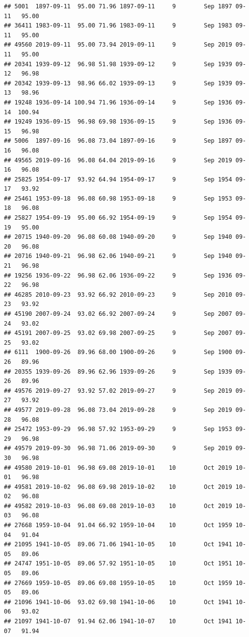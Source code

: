 \documentclass{article}\usepackage[]{graphicx}\usepackage[]{color}
\makeatletter
\newenvironment{kframe}{%
 \def\at@end@of@kframe{}%
 \ifinner\ifhmode%
  \def\at@end@of@kframe{\end{minipage}}%
  \begin{minipage}{\columnwidth}%
 \fi\fi%
 \def\FrameCommand##1{\hskip\@totalleftmargin \hskip-\fboxsep
 \colorbox{shadecolor}{##1}\hskip-\fboxsep
     \hskip-\linewidth \hskip-\@totalleftmargin \hskip\columnwidth}%
 \MakeFramed {\advance\hsize-\width
   \@totalleftmargin\z@ \linewidth\hsize
   \@setminipage}}%
 {\par\unskip\endMakeFramed%
 \at@end@of@kframe}
\newenvironment{knitrout}{}{} %
\makeatother
\begin{document}
\begin{knitrout}
\begin{kframe}
\begin{verbatim}
## 5001  1897-09-11  95.00 71.96 1897-09-11     9        Sep 1897 09-11   95.00
## 36411 1983-09-11  95.00 71.96 1983-09-11     9        Sep 1983 09-11   95.00
## 49560 2019-09-11  95.00 73.94 2019-09-11     9        Sep 2019 09-11   95.00
## 20341 1939-09-12  96.98 51.98 1939-09-12     9        Sep 1939 09-12   96.98
## 20342 1939-09-13  98.96 66.02 1939-09-13     9        Sep 1939 09-13   98.96
## 19248 1936-09-14 100.94 71.96 1936-09-14     9        Sep 1936 09-14  100.94
## 19249 1936-09-15  96.98 69.98 1936-09-15     9        Sep 1936 09-15   96.98
## 5006  1897-09-16  96.08 73.04 1897-09-16     9        Sep 1897 09-16   96.08
## 49565 2019-09-16  96.08 64.04 2019-09-16     9        Sep 2019 09-16   96.08
## 25825 1954-09-17  93.92 64.94 1954-09-17     9        Sep 1954 09-17   93.92
## 25461 1953-09-18  96.08 60.98 1953-09-18     9        Sep 1953 09-18   96.08
## 25827 1954-09-19  95.00 66.92 1954-09-19     9        Sep 1954 09-19   95.00
## 20715 1940-09-20  96.08 60.08 1940-09-20     9        Sep 1940 09-20   96.08
## 20716 1940-09-21  96.98 62.06 1940-09-21     9        Sep 1940 09-21   96.98
## 19256 1936-09-22  96.98 62.06 1936-09-22     9        Sep 1936 09-22   96.98
## 46285 2010-09-23  93.92 66.92 2010-09-23     9        Sep 2010 09-23   93.92
## 45190 2007-09-24  93.02 66.92 2007-09-24     9        Sep 2007 09-24   93.02
## 45191 2007-09-25  93.02 69.98 2007-09-25     9        Sep 2007 09-25   93.02
## 6111  1900-09-26  89.96 68.00 1900-09-26     9        Sep 1900 09-26   89.96
## 20355 1939-09-26  89.96 62.96 1939-09-26     9        Sep 1939 09-26   89.96
## 49576 2019-09-27  93.92 57.02 2019-09-27     9        Sep 2019 09-27   93.92
## 49577 2019-09-28  96.08 73.04 2019-09-28     9        Sep 2019 09-28   96.08
## 25472 1953-09-29  96.98 57.92 1953-09-29     9        Sep 1953 09-29   96.98
## 49579 2019-09-30  96.98 71.06 2019-09-30     9        Sep 2019 09-30   96.98
## 49580 2019-10-01  96.98 69.08 2019-10-01    10        Oct 2019 10-01   96.98
## 49581 2019-10-02  96.08 69.98 2019-10-02    10        Oct 2019 10-02   96.08
## 49582 2019-10-03  96.08 69.08 2019-10-03    10        Oct 2019 10-03   96.08
## 27668 1959-10-04  91.04 66.92 1959-10-04    10        Oct 1959 10-04   91.04
## 21095 1941-10-05  89.06 71.06 1941-10-05    10        Oct 1941 10-05   89.06
## 24747 1951-10-05  89.06 57.92 1951-10-05    10        Oct 1951 10-05   89.06
## 27669 1959-10-05  89.06 69.08 1959-10-05    10        Oct 1959 10-05   89.06
## 21096 1941-10-06  93.02 69.98 1941-10-06    10        Oct 1941 10-06   93.02
## 21097 1941-10-07  91.94 62.06 1941-10-07    10        Oct 1941 10-07   91.94

\end{verbatim}
\end{kframe}
\end{knitrout}
\end{document}
